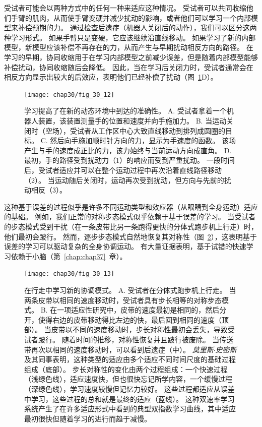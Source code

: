 受试者可能会以两种方式中的任何一种来适应这种情况。
受试者可以共同收缩他们手臂的肌肉，从而使手臂变硬并减少扰动的影响，或者他们可以学习一个内部模型来补偿预期的力。
通过检查后遗症（机器人关闭后的动作），我们可以区分这两种学习形式。
如果手臂只是变硬，它应该继续沿直线移动。
如果学习了新的内部模型，新模型应该补偿不再存在的力，从而产生与早期扰动相反方向的路径。
在学习的早期，协同收缩用于在学习内部模型之前减少误差，但是随着内部模型能够补偿扰动，协同收缩随后会降低。
因此，当在学习后关闭力时，受试者通常会在相反方向显示出较大的后效应，表明他们已经补偿了扰动（图~\ref{fig:30_12}D）。


\begin{figure}[htbp]
	\centering
	\texttt{[image: chap30/fig\_30\_12]}
	\caption{学习提高了在新的动态环境中到达的准确性\cite{brashers1996consolidation}。
		A. 受试者拿着一个机器人装置，该装置测量手的位置和速度并向手施加力。
		B. 当运动关闭时（空场），受试者从工作区中心大致直线移动到排列成圆圈的目标。
		C. 然后向手施加顺时针方向的力，显示为手速度的函数。
		该场产生与手的速度成正比的力，该力始终与当前运动方向成直角。
		D. 最初，手的路径受到扰动力（1）的响应而受到严重扰动。
		一段时间后，受试者适应并可以在整个运动过程中再次沿着直线路径移动（2）。
		当运动随后关闭时，运动再次受到扰动，但方向与先前的扰动相反（3）。}
	\label{fig:30_12}
\end{figure}


这种基于误差的过程似乎是许多不同运动类型和效应器（从眼睛到全身运动）适应的基础。
例如，我们正常的对称步态模式似乎依赖于基于误差的学习。
当受试者的步态模式受到干扰（在一条皮带比另一条跑得更快的分体式跑步机上行走）时，他们最初会跛行。
然而，逐步步态模式自然地恢复其对称性（图~\ref{fig:30_13}），这表明基于误差的学习可以驱动复杂的全身协调运动。
有大量证据表明，基于试错的快速学习依赖于小脑（第~\ref{chap:chap37}~章）。


\begin{figure}[htbp]
	\centering
	\texttt{[image: chap30/fig\_30\_13]}
	\caption{在行走中学习新的协调模式。
		A. 受试者在分体式跑步机上行走。
		当两条皮带以相同的速度移动时，受试者具有步长相等的对称步态模式。
		B. 在一项适应性研究中，皮带的速度最初是相同的，然后分开，使得右边的皮带移动得比左边的快，最后回到相同的速度（顶部）。
		当皮带以不同的速度移动时，步长对称性最初会丢失，导致受试者跛行。
		随着时间的推移，对称性恢复并且跛行被废除。
		当传送带再次以相同的速度移动时，可以看到后遗症（中）。
		\textit{莫里斯$\cdot$史密斯}及其同事表明，这种类型的适应由多个适应不同时间尺度的基础过程组成（底部）。
		步长对称性的变化由两个过程组成：一个快速过程（浅绿色线），适应速度快，但也很快忘记所学内容，一个缓慢过程（深绿色线），学习速度较慢但记忆力较好。
		这些过程都适应从误差中学习，这些过程的总和就是最终的适应（蓝线）。
		这种双速率学习系统产生了在许多适应形式中看到的典型双指数学习曲线，其中适应最初很快但随着学习的进行而趋于减慢\cite{roemmich2016seeing}。}
	\label{fig:30_13}
\end{figure}


